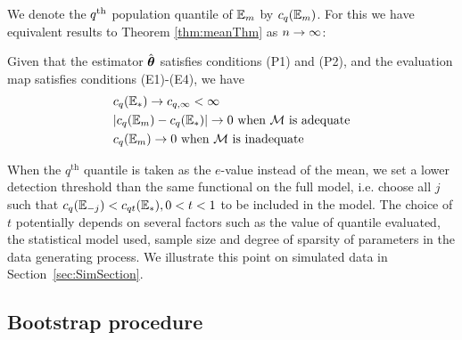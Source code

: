 We denote the $q^{\operatorname*{\text{th}}}$ population quantile of ${\mathbb{E}}_{m }$ by $c_{q} ( {\mathbb{E}}_{m } ) $. For this we have equivalent results to Theorem \ref{thm:meanThm} as $n \rightarrow \infty$:

\begin{Theorem}\label{thm:quantileThm}
Given that the estimator $\hat {{\boldsymbol{\theta}}}$ satisfies conditions (P1) and (P2), and the evaluation map satisfies conditions (E1)-(E4), we have
%
\begin{align}
& c_{q} ( {\mathbb{E}}_{* } ) \rightarrow c_{q,\infty} < \infty \label{evalEqn1}\\
& | c_{q} ( {\mathbb{E}}_{m } ) - c_{q} ( {\mathbb{E}}_{* } ) | \rightarrow 0 \text{ when } {\cal{M}} \text{ is adequate}\label{evalEqn2}\\
& c_{q} ( {\mathbb{E}}_{m } ) \rightarrow 0 \text{ when } {\cal{M}} \text{ is inadequate} \label{evalEqn3}
\end{align}
\end{Theorem}
%

When the $q^\text{th}$ quantile is taken as the $e$-value instead of the mean, we set a lower detection threshold than the same functional on the full model, i.e. choose all $j$ such that $c_q ({\mathbb{E}}_{-j}) < c_{q t} ({\mathbb{E}}_{*}), 0 < t < 1$ to be included in the model. The choice of $t$ potentially depends on several factors such as the value of quantile evaluated, the statistical model used, sample size and degree of sparsity of parameters in the data generating process. We illustrate this point on simulated data in Section~\ref{sec:SimSection}.

\subsection{Bootstrap procedure}

